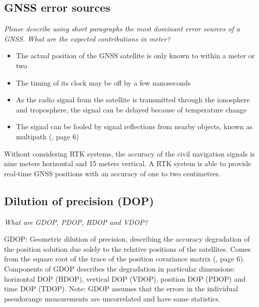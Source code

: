 \documentclass[paper=letter, fontsize=10pt]{article}
\begin{document}
\subsection{GNSS error sources}
\emph{Please describe using short paragraphs the most dominant error sources of a GNSS. What are the
expected contributions in meter?}

\begin{itemize}
\item The actual position of the GNSS satellite is only known to within a meter or two
\item The timing of its clock may be off by a few nanoseconds
\item As the radio signal from the satellite is transmitted through the ionosphere and troposphere, the signal can be delayed because of temperature change
\item The signal can be fooled by signal reflections from nearby objects, known as multipath (\cite{GNSS_Cobb}, page 6)
\end{itemize}

Without considering RTK systems, the accuracy of the civil navigation signals is nine meters horizontal and 15 meters vertical. A RTK system is able to provide real-time GNSS positions with an accuracy of one to two centimetres.

\subsection{Dilution of precision (DOP)}
\emph{What are GDOP, PDOP, HDOP and VDOP?}

GDOP: Geometric dilution of precision, describing the accuracy degradation of the position solution due solely to the relative positions of the satellites. Comes from the square root of the trace of the position covariance matrix (\cite{GNSS_Cobb}, page 6).
Components of GDOP describes the degradation in particular dimensions: horizontal DOP (HDOP), vertical DOP (VDOP), position DOP (PDOP) and time DOP (TDOP). 
Note: GDOP assumes that the errors in the individual pseudorange measurements are uncorrelated and have same statistics.
\end{document}

